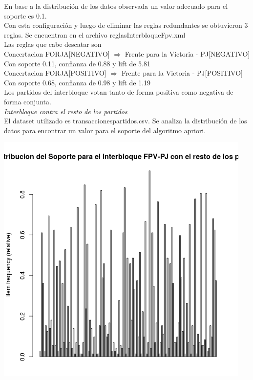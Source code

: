 \documentclass{endm}
\begin{document}
En base a la distribución de los datos observada un valor adecuado para el soporte es 0.1.\\

Con esta configuración y luego de eliminar las reglas redundantes se obtuvieron 3 reglas. Se encuentran en el archivo reglasInterbloqueFpv.xml  \\

Las reglas que cabe descatar son \\

{Concertacion FORJA[NEGATIVO]} $\Longrightarrow$ {Frente para la Victoria - PJ[NEGATIVO]} \\

Con soporte 0.11, confianza de 0.88 y lift de 5.81 \\

{Concertacion FORJA[POSITIVO]} $\Longrightarrow$ {Frente para la Victoria - PJ[POSITIVO]} \\

Con soporte 0.68, confianza de 0.98 y lift de 1.19 \\

Los partidos del interbloque votan tanto de forma positiva como negativa de forma conjunta. \\

\textit{Interbloque contra el resto de los partidos} \\

El dataset utilizado es transaccionespartidos.csv. Se analiza la distribución de los datos para encontrar un valor para el soporte del algoritmo apriori. \\

\begin{center}
\includegraphics[scale=0.4]{graficos/soportesFpvRestoPartidos.png}
\end{center}
\end{document}
